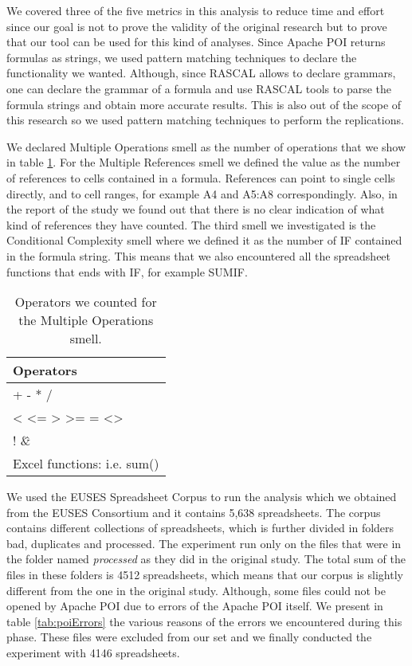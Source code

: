 We covered three of the five metrics in this analysis to reduce time and effort since our goal is not to prove the validity of the original research but to prove that our tool can be used for this kind of analyses. Since Apache POI returns formulas as strings, we used pattern matching techniques to declare the functionality we wanted. Although, since RASCAL allows to declare grammars, one can declare the grammar of a formula and use RASCAL tools to parse the formula strings and obtain more accurate results. This is also out of the scope of this research so we used pattern matching techniques to perform the replications.

We declared Multiple Operations smell as the number of operations that we show in table \ref{tab:mulSmells}. For the Multiple References smell we defined the value as the number of references to cells contained in a formula. References can point to single cells directly, and to cell ranges, for example A4 and A5:A8 correspondingly. Also, in the report of the study we found out that there is no clear indication of what kind of references they have counted. The third smell we investigated is the Conditional Complexity smell where we defined it as the number of IF contained in the formula string. This means that we also encountered all the spreadsheet functions that ends with IF, for example SUMIF.

\begin{table}[h]
\centering
    \begin{tabular}{l}
    \hline
    Operators           \\
    \hline
    +  -  *  /             \\
    <  <=  >  >=  =  <> \\
      ! \^  \&            \\
      Excel functions: i.e. sum()
    \end{tabular}
    \caption{Operators we counted for the Multiple Operations smell.}\label{tab:mulSmells}
\end{table}

We used the EUSES Spreadsheet Corpus to run the analysis which we obtained from the EUSES Consortium and it contains 5,638 spreadsheets. The corpus contains different collections of spreadsheets, which is further divided in folders bad, duplicates and processed. The experiment run only on the files that were in the folder named \textsl{processed} as they did in the original study. The total sum of the files in these folders is 4512 spreadsheets, which means that our corpus is slightly different from the one in the original study. Although, some files could not be opened by Apache POI due to errors of the Apache POI itself. We present in table \ref{tab:poiErrors} the various reasons of the errors we encountered during this phase. These files were excluded from our set and we finally conducted the experiment with 4146 spreadsheets.


